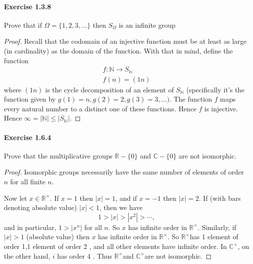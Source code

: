 \documentclass{article}
\theoremstyle{definition}
\begin{document}
\paragraph{Exercise 1.3.8} Prove that if $\Omega=\{1,2,3, \ldots\}$ then $S_{\Omega}$ is an infinite group
\begin{proof}
    Recall that the codomain of an injective function must be at least as large (in cardinality) as the domain of the function. With that in mind, define the function
$$
\begin{gathered}
f: \mathbb{N} \rightarrow S_{\mathbb{N}} \\
f(n)=(1 n)
\end{gathered}
$$
where $(1 n)$ is the cycle decomposition of an element of $S_{\mathbb{N}}$ (specifically it's the function given by $g(1)=n, g(2)=2, g(3)=3, \ldots)$. The function $f$ maps every natural number to a distinct one of these functions. Hence $f$ is injective. Hence $\infty=|\mathbb{N}| \leq\left|S_{\mathbb{N}}\right|$.
\end{proof}



\paragraph{Exercise 1.6.4} Prove that the multiplicative groups $\mathbb{R}-\{0\}$ and $\mathbb{C}-\{0\}$ are not isomorphic.
\begin{proof}
    Isomorphic groups necessarily have the same number of elements of order $n$ for all finite $n$.

Now let $x \in \mathbb{R}^{\times}$. If $x=1$ then $|x|=1$, and if $x=-1$ then $|x|=2$. If (with bars denoting absolute value) $|x|<1$, then we have
$$
1>|x|>\left|x^2\right|>\cdots,
$$
and in particular, $1>\left|x^n\right|$ for all $n$. So $x$ has infinite order in $\mathbb{R}^{\times}$.
Similarly, if $|x|>1$ (absolute value) then $x$ has infinite order in $\mathbb{R}^{\times}$. So $\mathbb{R}^{\times}$has 1 element of order 1,1 element of order 2 , and all other elements have infinite order.
In $\mathbb{C}^{\times}$, on the other hand, $i$ has order 4 . Thus $\mathbb{R}^{\times}$and $\mathbb{C}^{\times}$are not isomorphic.
\end{proof}
\end{document}
